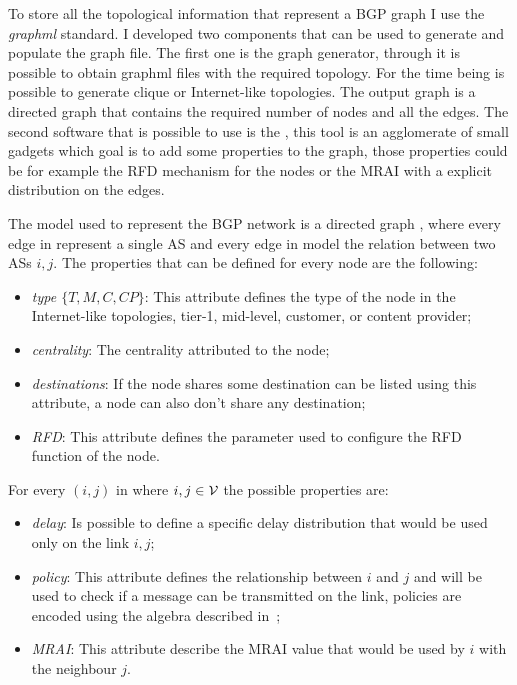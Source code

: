 To store all the topological information that represent a \ac{BGP} graph I use
the \textit{graphml} standard.
I developed two components that can be used to generate and populate the graph
file.
The first one is the graph generator, through it is possible to obtain graphml
files with the required topology. For the time being is possible to generate
clique or Internet-like topologies.
The output graph is a directed graph that contains the required number of nodes
and all the edges.
The second software that is possible to use is the , this
tool is an agglomerate of small gadgets which goal is to add some properties to
the graph, those properties could be for example the \ac{RFD} mechanism for
the nodes or the \ac{MRAI} with a explicit distribution on the edges.

The model used to represent the \ac{BGP} network is a directed graph \graph,
where every edge in \nodeset represent a single \ac{AS} and every edge in
\edgeset model the relation between two \acp{AS} \(i,j\).
The properties that can be defined for every node are the following:
\begin{itemize}
		\item \textit{type \(\{T,M,C,CP\}\)}: This attribute defines the type
				of the node in the Internet-like topologies, tier-1,
				mid-level, customer, or content provider;
		\item \textit{centrality}: The centrality attributed to the node;
		\item \textit{destinations}: If the node shares some destination can
				be listed using this attribute, a node can also don't share
				any destination;
		\item \textit{\ac{RFD}}: This attribute defines the parameter used
				to configure the \ac{RFD} function of the node.
\end{itemize}

For every \((i,j)\) in \edgeset where \(i,j \in \mathcal{V}\) the possible properties
are:
\begin{itemize}
		\item \textit{delay}: Is possible to define a specific delay distribution
				that would be used only on the link \(i,j\);
		\item \textit{policy}: This attribute defines the relationship between
				\(i\) and \(j\) and will be used to check if a message can
				be transmitted on the link, policies are encoded using the
				algebra described in~\cite{daggitt2018rate};
		\item \textit{\ac{MRAI}}: This attribute describe the \ac{MRAI} value
				that would be used by \(i\) with the neighbour \(j\).
\end{itemize}

